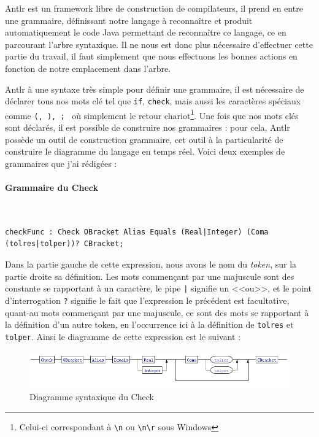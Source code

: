 		Antlr est un framework libre de construction de compilateurs, il prend en entre une grammaire, définissant notre langage à reconnaître et produit automatiquement le code Java permettant de reconnaître ce langage, ce en parcourant l'arbre syntaxique. Il ne nous est donc plus nécessaire d'effectuer cette partie du travail, il faut simplement que nous effectuons les bonnes actions en fonction de notre emplacement dans l'arbre.

		Antlr à une syntaxe très simple pour définir une grammaire, il est nécessaire de déclarer tous nos mots clé tel que \texttt{if}, \texttt{check}, mais aussi les caractères spéciaux comme \texttt{(, ), {; }} où simplement le retour chariot\footnote{Celui-ci correspondant à \texttt{\textbackslash n} ou \texttt{\textbackslash  n\textbackslash r} sous Windows}. Une fois que nos mots clés sont déclarés, il est possible de construire nos grammaires : pour cela, Antlr possède un outil de construction grammaire, cet outil à la particularité de construire le diagramme du langage en temps réel. Voici deux exemples de grammaires que j'ai rédigées :

		\paragraph{Grammaire du Check}~\\
\begin{lstlisting}[caption=Grammaire Check, numbers=none]
checkFunc : Check OBracket Alias Equals (Real|Integer) (Coma (tolres|tolper))? CBracket;
\end{lstlisting}
Dans la partie gauche de cette expression, nous avons le nom du \textit{token}, sur la partie droite sa définition. Les mots commençant par une majuscule sont des constante se rapportant à un caractère, le pipe \texttt{|} signifie un <<ou>>, et le point d'interrogation \texttt{?} signifie le fait que l'expression le précédent est facultative, quant-au mots commençant par une majuscule, ce sont des mots se rapportant à la définition d'un autre token, en l'occurrence ici à la définition de \texttt{tolres} et \texttt{tolper}. Ainsi le diagramme de cette expression est le suivant : 
\begin{figure}[H]
	\centering
	\includegraphics[width=18cm]{contents/images/check.png}
	\caption{Diagramme syntaxique du Check}
\end{figure}

